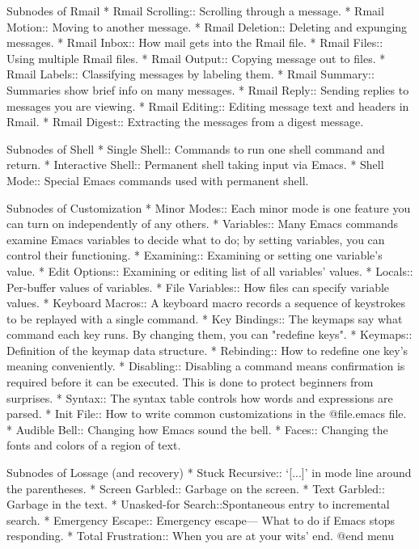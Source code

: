 Subnodes of Rmail
* Rmail Scrolling::   Scrolling through a message.
* Rmail Motion::      Moving to another message.
* Rmail Deletion::    Deleting and expunging messages.
* Rmail Inbox::       How mail gets into the Rmail file.
* Rmail Files::       Using multiple Rmail files.
* Rmail Output::      Copying message out to files.
* Rmail Labels::      Classifying messages by labeling them.
* Rmail Summary::     Summaries show brief info on many messages.
* Rmail Reply::       Sending replies to messages you are viewing.
* Rmail Editing::     Editing message text and headers in Rmail.
* Rmail Digest::      Extracting the messages from a digest message.

Subnodes of Shell
* Single Shell::      Commands to run one shell command and return.
* Interactive Shell:: Permanent shell taking input via Emacs.
* Shell Mode::        Special Emacs commands used with permanent shell.

Subnodes of Customization
* Minor Modes::       Each minor mode is one feature you can turn on
                       independently of any others.
* Variables::         Many Emacs commands examine Emacs variables
                       to decide what to do; by setting variables,
                       you can control their functioning.
* Examining::         Examining or setting one variable's value.
* Edit Options::      Examining or editing list of all variables' values.
* Locals::            Per-buffer values of variables.
* File Variables::    How files can specify variable values.
* Keyboard Macros::   A keyboard macro records a sequence of keystrokes
                       to be replayed with a single command.
* Key Bindings::      The keymaps say what command each key runs.
                       By changing them, you can "redefine keys".
* Keymaps::           Definition of the keymap data structure.
* Rebinding::         How to redefine one key's meaning conveniently.
* Disabling::         Disabling a command means confirmation is required
                       before it can be executed.  This is done to protect
                       beginners from surprises.
* Syntax::            The syntax table controls how words and expressions
                       are parsed.
* Init File::         How to write common customizations in the @file{.emacs}
                       file.
* Audible Bell::      Changing how Emacs sound the bell.
* Faces::
                      Changing the fonts and colors of a region of text. 

Subnodes of Lossage (and recovery)
* Stuck Recursive::   `[...]' in mode line around the parentheses.
* Screen Garbled::    Garbage on the screen.
* Text Garbled::      Garbage in the text.
* Unasked-for Search::Spontaneous entry to incremental search.
* Emergency Escape::  Emergency escape---
                       What to do if Emacs stops responding.
* Total Frustration:: When you are at your wits' end.
@end menu

